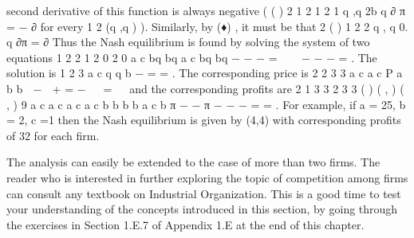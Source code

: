 \documentclass[11pt]{article} %
\begin{document}
second derivative of this function is always negative ( ( ) 2
1
2 1 2
1
q ,q 2b
q
∂ π
= −
∂
for every
1 2 (q ,q ) ). Similarly, by (♦) , it must be that 2 ( )
1 2
2
q , q 0.
q
∂π
=
∂
Thus the Nash
equilibrium is found by solving the system of two equations
1 2
2 1
2 0
2 0
a c bq bq
a c bq bq
− − − = 

 − − − =
. The solution is 1 2 3
a c
q q
b
−
= = . The corresponding price is
2
2
3 3
a c a c
P a b
b
 −  + = −   =
 
and the corresponding profits are
2
1 3 3 2 3 3
( )
( , ) ( , )
9
a c a c a c a c
b b b b
a c
b
π − − π − − −
= = . For example, if a = 25, b = 2, c =1 then the
Nash equilibrium is given by (4,4) with corresponding profits of 32 for each firm.

The analysis can easily be extended to the case of more than two firms. The reader
who is interested in further exploring the topic of competition among firms can
consult any textbook on Industrial Organization.
This is a good time to test your understanding of the concepts introduced in
this section, by going through the exercises in Section 1.E.7 of Appendix 1.E at the
end of this chapter.
\end{document}
